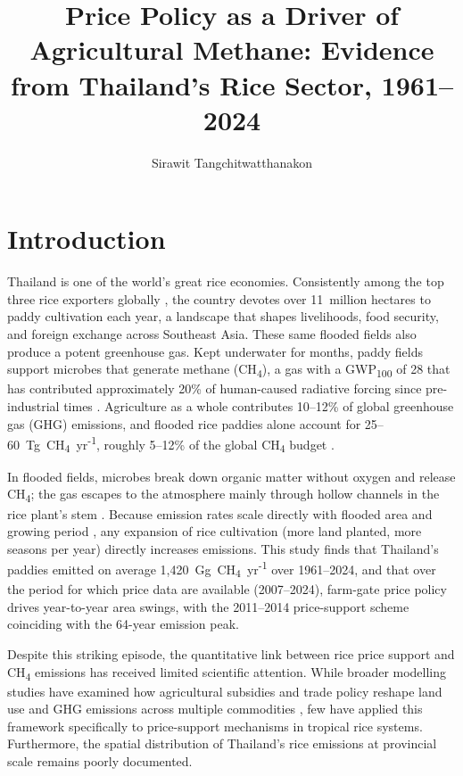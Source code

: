 \documentclass[fleqn,10pt]{olplainarticle}
\title{Price Policy as a Driver of Agricultural Methane: Evidence from
       Thailand's Rice Sector, 1961--2024}
\author[1]{Sirawit Tangchitwatthanakon}
\affil[1]{The Hong Kong University of Science and Technology (Guangzhou), Guangzhou, China}
\begin{document}
\onehalfspacing

\flushbottom
\maketitle
\thispagestyle{empty}

\section*{Introduction}

Thailand is one of the world's great rice economies.
Consistently among the top three rice exporters globally \citep{faostat2026},
the country devotes over 11~million hectares to paddy cultivation each year, a landscape
that shapes livelihoods, food security, and foreign exchange across Southeast
Asia.
These same flooded fields also produce a potent greenhouse gas.
Kept underwater for months, paddy fields support microbes that generate
methane (CH\textsubscript{4}), a gas with a GWP\textsubscript{100} of 28
that has contributed approximately 20\% of human-caused radiative forcing
since pre-industrial times \citep{myhre2013}.
Agriculture as a whole contributes 10--12\% of global greenhouse gas (GHG)
emissions, and flooded rice paddies alone account for 25--60~Tg~CH\textsubscript{4}~yr\textsuperscript{-1},
roughly 5--12\% of the global CH\textsubscript{4} budget
\citep{neue1993, yan2009, smith2014}.

In flooded fields, microbes break down organic matter without oxygen and release
CH\textsubscript{4}; the gas escapes to the atmosphere mainly through hollow
channels in the rice plant's stem \citep{neue1993}.
Because emission rates scale directly with flooded area and growing period
\citep{ipcc2006}, any expansion of rice cultivation (more land planted, more
seasons per year) directly increases emissions.
This study finds that Thailand's paddies emitted on average
1,420~Gg~CH\textsubscript{4}~yr\textsuperscript{-1} over 1961--2024,
and that over the period for which price data are available (2007--2024),
farm-gate price policy drives year-to-year area swings, with the 2011--2014 price-support scheme coinciding
with the 64-year emission peak.

Despite this striking episode, the quantitative link between rice price
support and CH\textsubscript{4} emissions has received limited scientific
attention.
While broader modelling studies have examined how agricultural subsidies
and trade policy reshape land use and GHG emissions across multiple commodities
\citep{frank2018}, few have applied this framework specifically
to price-support mechanisms in tropical rice systems.
Furthermore, the spatial distribution of Thailand's rice emissions at
provincial scale remains poorly documented.
\end{document}
